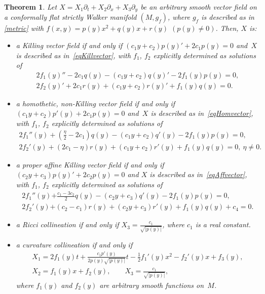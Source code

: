 \documentclass[pdftex]{sigma}
\numberwithin{equation}{section}
\newtheorem{Theorem}{Theorem}[section]
\begin{document}
\begin{Theorem}\label{cflatW}
Let $X=X_1\partial_t+X_2\partial_x+X_3\partial_y$ be an arbitrary smooth vector field on a conformally flat strictly Walker manifold $(M,g_f)$, where $g_f$ is described as in \eqref{metric} with $f(x,y)=p(y)x^2+q(y)x+r(y)$ $(p(y)\neq 0)$. Then, $X$ is:
\begin{itemize}\itemsep=0pt
\item[$i)$] a Killing vector field if and only if $(c_1y+c_2)p(y)'+2c_1p(y)=0$ and~$X$ is described as in~\eqref{eqKillvector}, with $f_1$, $f_2$ explicitly determined as solutions of
\begin{gather*}
2f_1(y)''-2c_1q(y)-(c_1y+c_2)q(y)'-2f_1(y)p(y)=0,\\
{2f_2(y)'+2c_1r(y)+}(c_1y+c_2)r(y)'+f_1(y)q(y)=0.
\end{gather*}
\item[$ii)$] a homothetic, non-Killing vector field if and only if $(c_1y+c_2)p'(y)+2c_1p(y)=0$ and~$X$ is described as in~\eqref{eqHomvector}, with $f_1$, $f_2$ explicitly determined as solutions of
\begin{gather*}
2f_1 ''(y)+(\frac{\eta}{2}-2c_1)q(y)-(c_1y+c_2)q '(y)-2f_1(y)p(y)=0,\\
{2f_2 '(y)+(2c_1-\eta)r(y)}+(c_1y+c_2)r'(y)+f_1(y)q(y)=0,\ \eta\neq0.
\end{gather*}
\item[$iii)$] a proper affine Killing vector field if and only if $(c_2y+c_3)p(y)'+2c_2p(y)=0$ and $X$ is described as in~\eqref{eqAffvector}, with $f_1$, $f_2$ explicitly determined as solutions of
\begin{gather*}
2f_1 ''(y){+\frac{c_1-3c_2}{2}q(y)}-(c_2y+c_3)q' (y)-2f_1(y)p(y)=0,\\
2f_2 '(y) {+(c_2-c_1)r(y)} +(c_2y+c_3)r '(y)+f_1(y)q(y)+c_4=0.
\end{gather*}
\item[$iv)$] a Ricci collineation if and only if $X_3=\frac{c_1}{\sqrt{|p(y)|}}$, where $c_1$ is a real constant.
\item[$v)$] a curvature collineation if and only if
\begin{gather*}
X_1=2f_1(y)t+\frac{c_1p'(y)}{2p(y)\sqrt{|p(y)|}}t-\frac12f_1 '(y)x^2-f_2 '(y)x+f_3(y),\\
X_2=f_1(y)x+f_2(y),\qquad
X_3=\frac{c_1}{\sqrt{|p(y)|}},
\end{gather*}
where $f_1(y)$ and $f_2(y)$ are arbitrary smooth functions on~$M$.
\end{itemize}
\end{Theorem}
\end{document}
